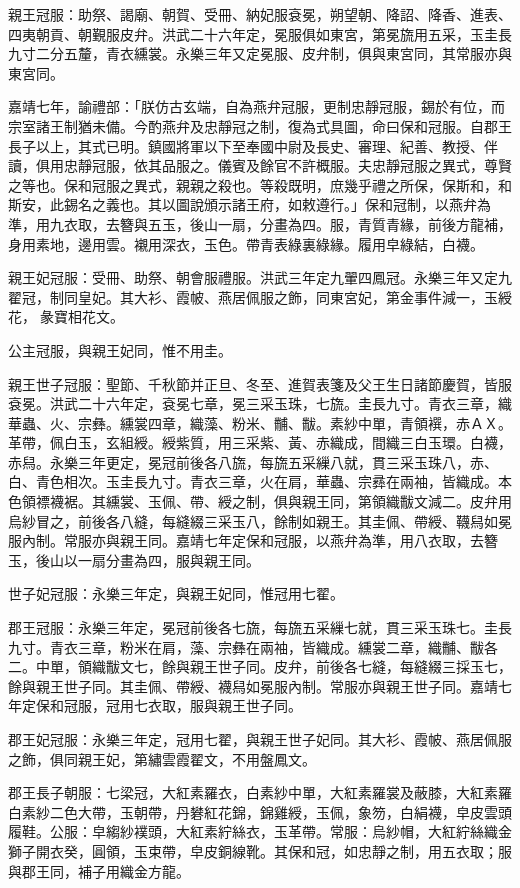 親王冠服：助祭、謁廟、朝賀、受冊、納妃服袞冕，朔望朝、降詔、降香、進表、四夷朝貢、朝覲服皮弁。洪武二十六年定，冕服俱如東宮，第冕旒用五采，玉圭長九寸二分五釐，青衣纁裳。永樂三年又定冕服、皮弁制，俱與東宮同，其常服亦與東宮同。

嘉靖七年，諭禮部：「朕仿古玄端，自為燕弁冠服，更制忠靜冠服，錫於有位，而宗室諸王制猶未備。今酌燕弁及忠靜冠之制，復為式具圖，命曰保和冠服。自郡王長子以上，其式已明。鎮國將軍以下至奉國中尉及長史、審理、紀善、教授、伴讀，俱用忠靜冠服，依其品服之。儀賓及餘官不許概服。夫忠靜冠服之異式，尊賢之等也。保和冠服之異式，親親之殺也。等殺既明，庶幾乎禮之所保，保斯和，和斯安，此錫名之義也。其以圖說頒示諸王府，如敕遵行。」保和冠制，以燕弁為準，用九衣取，去簪與五玉，後山一扇，分畫為四。服，青質青緣，前後方龍補，身用素地，邊用雲。襯用深衣，玉色。帶青表綠裏綠緣。履用皁綠結，白襪。

親王妃冠服：受冊、助祭、朝會服禮服。洪武三年定九翬四鳳冠。永樂三年又定九翟冠，制同皇妃。其大衫、霞帔、燕居佩服之飾，同東宮妃，第金事件減一，玉綬花，彖寶相花文。

公主冠服，與親王妃同，惟不用圭。

親王世子冠服：聖節、千秋節并正旦、冬至、進賀表箋及父王生日諸節慶賀，皆服袞冕。洪武二十六年定，袞冕七章，冕三采玉珠，七旒。圭長九寸。青衣三章，織華蟲、火、宗彝。纁裳四章，織藻、粉米、黼、黻。素紗中單，青領襈，赤ＡＸ。革帶，佩白玉，玄組綬。綬紫質，用三采紫、黃、赤織成，間織三白玉環。白襪，赤舄。永樂三年更定，冕冠前後各八旒，每旒五采繅八就，貫三采玉珠八，赤、白、青色相次。玉圭長九寸。青衣三章，火在肩，華蟲、宗彞在兩袖，皆織成。本色領褾襪裾。其纁裳、玉佩、帶、綬之制，俱與親王同，第領織黻文減二。皮弁用烏紗冒之，前後各八縫，每縫綴三采玉八，餘制如親王。其圭佩、帶綬、韈舄如冕服內制。常服亦與親王同。嘉靖七年定保和冠服，以燕弁為準，用八衣取，去簪玉，後山以一扇分畫為四，服與親王同。

世子妃冠服：永樂三年定，與親王妃同，惟冠用七翟。

郡王冠服：永樂三年定，冕冠前後各七旒，每旒五采繅七就，貫三采玉珠七。圭長九寸。青衣三章，粉米在肩，藻、宗彝在兩袖，皆織成。纁裳二章，織黼、黻各二。中單，領織黻文七，餘與親王世子同。皮弁，前後各七縫，每縫綴三採玉七，餘與親王世子同。其圭佩、帶綬、襪舄如冕服內制。常服亦與親王世子同。嘉靖七年定保和冠服，冠用七衣取，服與親王世子同。

郡王妃冠服：永樂三年定，冠用七翟，與親王世子妃同。其大衫、霞帔、燕居佩服之飾，俱同親王妃，第繡雲霞翟文，不用盤鳳文。

郡王長子朝服：七梁冠，大紅素羅衣，白素紗中單，大紅素羅裳及蔽膝，大紅素羅白素紗二色大帶，玉朝帶，丹礬紅花錦，錦雞綬，玉佩，象笏，白絹襪，皁皮雲頭履鞋。公服：皁縐紗襆頭，大紅素紵絲衣，玉革帶。常服：烏紗帽，大紅紵絲織金獅子開衣癸，圓領，玉束帶，皁皮銅線靴。其保和冠，如忠靜之制，用五衣取；服與郡王同，補子用織金方龍。

